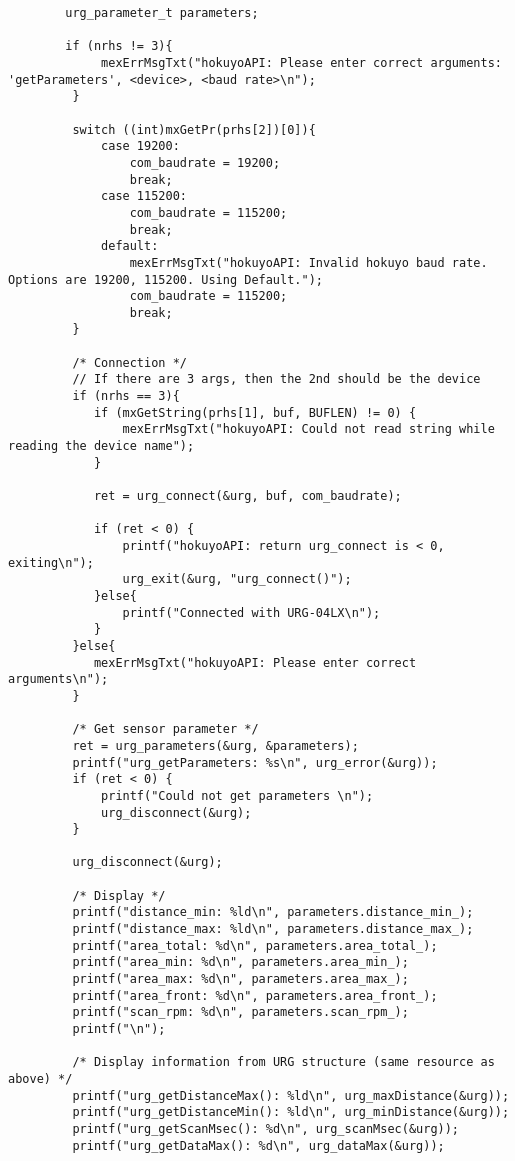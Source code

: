 \begin{lstlisting}
    	urg_parameter_t parameters;

        if (nrhs != 3){
             mexErrMsgTxt("hokuyoAPI: Please enter correct arguments: 'getParameters', <device>, <baud rate>\n");
         }

         switch ((int)mxGetPr(prhs[2])[0]){
             case 19200:
                 com_baudrate = 19200;
                 break;
             case 115200:
                 com_baudrate = 115200;
                 break;
             default:
                 mexErrMsgTxt("hokuyoAPI: Invalid hokuyo baud rate. Options are 19200, 115200. Using Default.");
                 com_baudrate = 115200;
                 break;
         }

         /* Connection */
         // If there are 3 args, then the 2nd should be the device
         if (nrhs == 3){
         	if (mxGetString(prhs[1], buf, BUFLEN) != 0) {
         		mexErrMsgTxt("hokuyoAPI: Could not read string while reading the device name");
         	}

         	ret = urg_connect(&urg, buf, com_baudrate);

         	if (ret < 0) {
         		printf("hokuyoAPI: return urg_connect is < 0, exiting\n");
         		urg_exit(&urg, "urg_connect()");
         	}else{
         		printf("Connected with URG-04LX\n");
         	}
         }else{
         	mexErrMsgTxt("hokuyoAPI: Please enter correct arguments\n");
         }

         /* Get sensor parameter */
         ret = urg_parameters(&urg, &parameters);
         printf("urg_getParameters: %s\n", urg_error(&urg));
         if (ret < 0) {
        	 printf("Could not get parameters \n");
        	 urg_disconnect(&urg);
         }

         urg_disconnect(&urg);

         /* Display */
         printf("distance_min: %ld\n", parameters.distance_min_);
         printf("distance_max: %ld\n", parameters.distance_max_);
         printf("area_total: %d\n", parameters.area_total_);
         printf("area_min: %d\n", parameters.area_min_);
         printf("area_max: %d\n", parameters.area_max_);
         printf("area_front: %d\n", parameters.area_front_);
         printf("scan_rpm: %d\n", parameters.scan_rpm_);
         printf("\n");

         /* Display information from URG structure (same resource as above) */
         printf("urg_getDistanceMax(): %ld\n", urg_maxDistance(&urg));
         printf("urg_getDistanceMin(): %ld\n", urg_minDistance(&urg));
         printf("urg_getScanMsec(): %d\n", urg_scanMsec(&urg));
         printf("urg_getDataMax(): %d\n", urg_dataMax(&urg));


\end{lstlisting}
